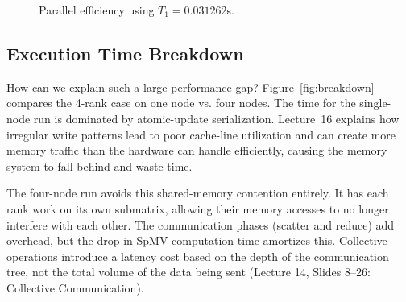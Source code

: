 \documentclass[twocolumn]{article}
\begin{document}
\begin{figure}[H]
\centering
{}
\caption{Parallel efficiency using $T_1=0.031262$s.}
\label{fig:eff}
\end{figure}

\subsection{Execution Time Breakdown}
How can we explain such a large performance gap? Figure~\ref{fig:breakdown} compares the 4-rank case on one node vs. four nodes. The time for the single-node run is dominated by atomic-update serialization. Lecture~16 explains how irregular write patterns lead to poor cache-line utilization and can create more memory traffic than the hardware can handle efficiently, causing the memory system to fall behind and waste time.

The four-node run avoids this shared-memory contention entirely. It has each rank work on its own submatrix, allowing their memory accesses to no longer interfere with each other. The communication phases (scatter and reduce) add overhead, but the drop in SpMV computation time amortizes this. Collective operations introduce a latency cost based on the depth of the communication tree, not the total volume of the data being sent (Lecture 14, Slides 8--26: Collective Communication).
\end{document}
